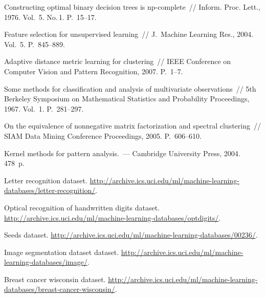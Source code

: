 \documentclass[12pt,twoside]{article}
\begin{document}
\begin{thebibliography}{10}
Constructing optimal binary decision trees is np-complete~//
Inform. Proc. Lett., 1976. Vol.~5. No.\,1. P.~15--17.

Feature selection for unsupervised learning~//
J.~Machine Learning Res., 2004. Vol.~5. P.~845--889.

Adaptive distance metric learning for clustering~//
IEEE Conference on Computer Vision and Pattern Recognition, 2007.
P.~1--7.

Some methods for classification and analysis of multivariate observations~//
5th Berkeley Symposium on Mathematical Statistics and
Probability Proceedings, 1967. Vol.~1. P.~281--297.

On the equivalence of nonnegative matrix factorization and spectral
clustering~//
SIAM Data Mining Conference Proceedings, 2005.  P.~606--610.

Kernel methods for pattern analysis.~--- Cambridge University Press,
2004. 478~p.

Letter recognition dataset.
\url{http://archive.ics.uci.edu/ml/machine-learning-databases/letter-recognition/}.

Optical recognition of handwritten digits dataset.
\url{http://archive.ics.uci.edu/ml/machine-learning-databases/optdigits/}.

Seeds dataset.
\url{http://archive.ics.uci.edu/ml/machine-learning-databases/00236/}.

Image segmentation dataset dataset.
\url{http://archive.ics.uci.edu/ml/machine-learning-databases/image/}.

Breast cancer wisconsin dataset.
  \url{http://archive.ics.uci.edu/ml/machine-learning-databases/breast-cancer-wisconsin/}.
\Russian
\end{thebibliography}
\end{document}

